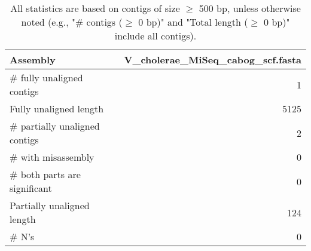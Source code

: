 \documentclass[12pt,a4paper]{article}
\begin{document}
\begin{table}[ht]
\begin{center}
\caption{All statistics are based on contigs of size $\geq$ 500 bp, unless otherwise noted (e.g., "\# contigs ($\geq$ 0 bp)" and "Total length ($\geq$ 0 bp)" include all contigs).}
\begin{tabular}{|l*{1}{|r}|}
\hline
Assembly & V\_cholerae\_MiSeq\_cabog\_scf.fasta \\ \hline
\# fully unaligned contigs & 1 \\ \hline
Fully unaligned length & 5125 \\ \hline
\# partially unaligned contigs & 2 \\ \hline
\hspace{5mm}\# with misassembly & 0 \\ \hline
\hspace{5mm}\# both parts are significant & 0 \\ \hline
Partially unaligned length & 124 \\ \hline
\# N's & 0 \\ \hline
\end{tabular}
\end{center}
\end{table}
\end{document}
